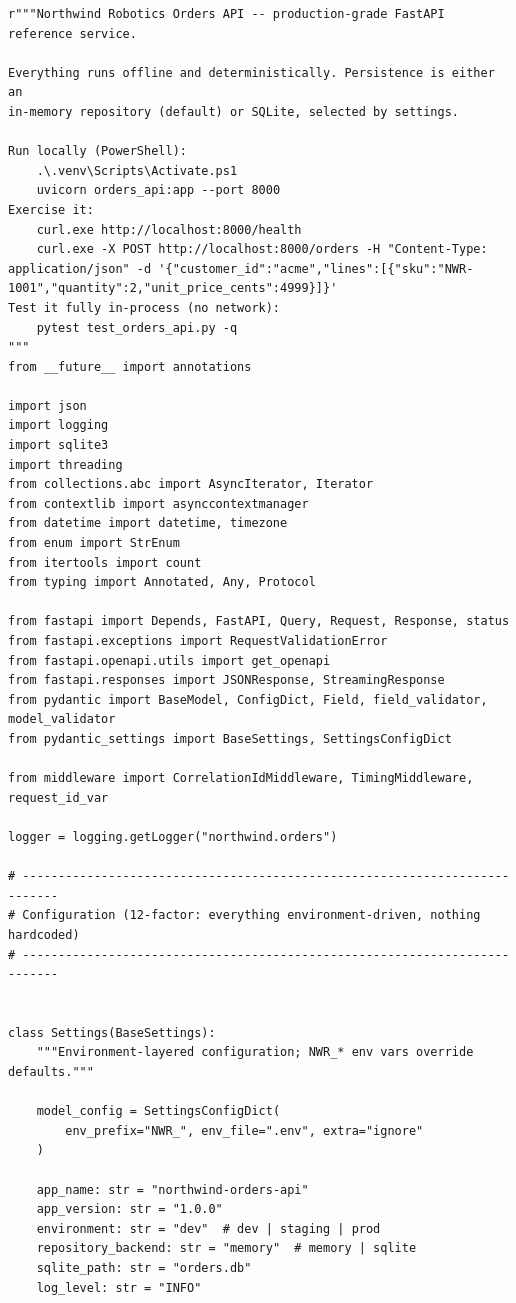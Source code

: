\begin{verbatim}
r"""Northwind Robotics Orders API -- production-grade FastAPI reference service.

Everything runs offline and deterministically. Persistence is either an
in-memory repository (default) or SQLite, selected by settings.

Run locally (PowerShell):
    .\.venv\Scripts\Activate.ps1
    uvicorn orders_api:app --port 8000
Exercise it:
    curl.exe http://localhost:8000/health
    curl.exe -X POST http://localhost:8000/orders -H "Content-Type: application/json" -d '{"customer_id":"acme","lines":[{"sku":"NWR-1001","quantity":2,"unit_price_cents":4999}]}'
Test it fully in-process (no network):
    pytest test_orders_api.py -q
"""
from __future__ import annotations

import json
import logging
import sqlite3
import threading
from collections.abc import AsyncIterator, Iterator
from contextlib import asynccontextmanager
from datetime import datetime, timezone
from enum import StrEnum
from itertools import count
from typing import Annotated, Any, Protocol

from fastapi import Depends, FastAPI, Query, Request, Response, status
from fastapi.exceptions import RequestValidationError
from fastapi.openapi.utils import get_openapi
from fastapi.responses import JSONResponse, StreamingResponse
from pydantic import BaseModel, ConfigDict, Field, field_validator, model_validator
from pydantic_settings import BaseSettings, SettingsConfigDict

from middleware import CorrelationIdMiddleware, TimingMiddleware, request_id_var

logger = logging.getLogger("northwind.orders")

# ---------------------------------------------------------------------------
# Configuration (12-factor: everything environment-driven, nothing hardcoded)
# ---------------------------------------------------------------------------


class Settings(BaseSettings):
    """Environment-layered configuration; NWR_* env vars override defaults."""

    model_config = SettingsConfigDict(
        env_prefix="NWR_", env_file=".env", extra="ignore"
    )

    app_name: str = "northwind-orders-api"
    app_version: str = "1.0.0"
    environment: str = "dev"  # dev | staging | prod
    repository_backend: str = "memory"  # memory | sqlite
    sqlite_path: str = "orders.db"
    log_level: str = "INFO"



\end{verbatim}
